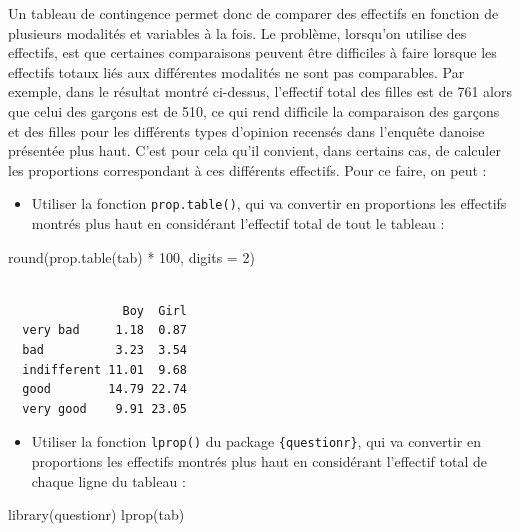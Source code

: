 \documentclass[
  letterpaper,
]{book}
\newenvironment{Shaded}{\begin{snugshade}}{\end{snugshade}}
\newcommand{\AttributeTok}[1]{\textcolor[rgb]{0.40,0.45,0.13}{#1}}
\newcommand{\DecValTok}[1]{\textcolor[rgb]{0.68,0.00,0.00}{#1}}
\newcommand{\FunctionTok}[1]{\textcolor[rgb]{0.28,0.35,0.67}{#1}}
\newcommand{\NormalTok}[1]{\textcolor[rgb]{0.00,0.23,0.31}{#1}}
\newcommand{\SpecialCharTok}[1]{\textcolor[rgb]{0.37,0.37,0.37}{#1}}
\providecommand{\tightlist}{%
  \setlength{\itemsep}{0pt}\setlength{\parskip}{0pt}}\usepackage{longtable,booktabs,array}
\begin{document}
Un tableau de contingence permet donc de comparer des effectifs en
fonction de plusieurs modalités et variables à la fois. Le problème,
lorsqu'on utilise des effectifs, est que certaines comparaisons peuvent
être difficiles à faire lorsque les effectifs totaux liés aux
différentes modalités ne sont pas comparables. Par exemple, dans le
résultat montré ci-dessus, l'effectif total des filles est de 761 alors
que celui des garçons est de 510, ce qui rend difficile la comparaison
des garçons et des filles pour les différents types d'opinion recensés
dans l'enquête danoise présentée plus haut. C'est pour cela qu'il
convient, dans certains cas, de calculer les proportions correspondant à
ces différents effectifs. Pour ce faire, on peut :

\begin{itemize}
\tightlist
\item
  Utiliser la fonction \texttt{prop.table()}, qui va convertir en
  proportions les effectifs montrés plus haut en considérant l'effectif
  total de tout le tableau :
\end{itemize}

\begin{Shaded}
\begin{Highlighting}[]
\FunctionTok{round}\NormalTok{(}\FunctionTok{prop.table}\NormalTok{(tab) }\SpecialCharTok{*} \DecValTok{100}\NormalTok{, }\AttributeTok{digits =} \DecValTok{2}\NormalTok{)}
\end{Highlighting}
\end{Shaded}

\begin{verbatim}
             
                Boy  Girl
  very bad     1.18  0.87
  bad          3.23  3.54
  indifferent 11.01  9.68
  good        14.79 22.74
  very good    9.91 23.05
\end{verbatim}

\begin{itemize}
\tightlist
\item
  Utiliser la fonction \texttt{lprop()} du package
  \texttt{\{questionr\}}, qui va convertir en proportions les effectifs
  montrés plus haut en considérant l'effectif total de chaque ligne du
  tableau :
\end{itemize}

\begin{Shaded}
\begin{Highlighting}[]
\FunctionTok{library}\NormalTok{(questionr)}
\FunctionTok{lprop}\NormalTok{(tab)}
\end{Highlighting}
\end{Shaded}
\end{document}

